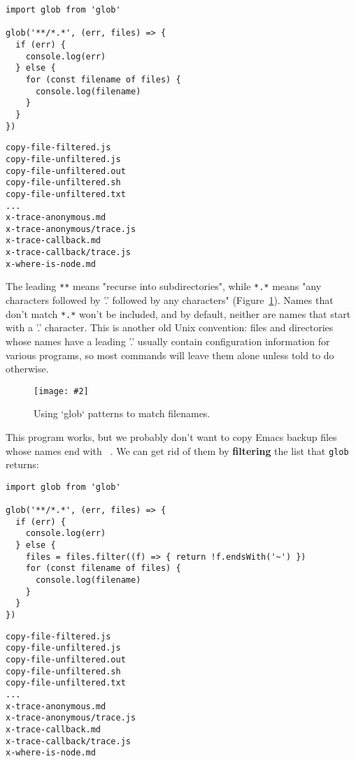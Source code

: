 \documentclass[krantzl]{krantz}
\newcommand{\figpdf}[4]{\begin{figure}%
\centering%
\texttt{[image: \#2]}%
\caption{#3}%
\label{#1}%
\end{figure}}
\newcommand{\figref}[1]{Figure~\ref{#1}}
\newcommand{\glossref}[1]{\textbf{#1}}
\begin{document}
\begin{lstlisting}[frame=single,frameround=tttt]
import glob from 'glob'

glob('**/*.*', (err, files) => {
  if (err) {
    console.log(err)
  } else {
    for (const filename of files) {
      console.log(filename)
    }
  }
})
\end{lstlisting}



\begin{lstlisting}[frame=single,frameround=tttt]
copy-file-filtered.js
copy-file-unfiltered.js
copy-file-unfiltered.out
copy-file-unfiltered.sh
copy-file-unfiltered.txt
...
x-trace-anonymous.md
x-trace-anonymous/trace.js
x-trace-callback.md
x-trace-callback/trace.js
x-where-is-node.md
\end{lstlisting}



The leading \texttt{**} means "recurse into subdirectories",
while \texttt{*.*} means "any characters followed by '.' followed by any characters"
(\figref{systems-programming-globbing}).
Names that don't match \texttt{*.*} won't be included,
and by default,
neither are names that start with a '.' character.
This is another old Unix convention:
files and directories whose names have a leading '.'
usually contain configuration information for various programs,
so most commands will leave them alone unless told to do otherwise.

\figpdf{systems-programming-globbing}{./systems-programming/globbing.pdf}{Using `glob` patterns to match filenames.}{0.6}


This program works,
but we probably don't want to copy Emacs backup files whose names end with \texttt{~}.
We can get rid of them by \glossref{filtering} the list that \texttt{glob} returns:


\begin{lstlisting}[frame=single,frameround=tttt]
import glob from 'glob'

glob('**/*.*', (err, files) => {
  if (err) {
    console.log(err)
  } else {
    files = files.filter((f) => { return !f.endsWith('~') })
    for (const filename of files) {
      console.log(filename)
    }
  }
})
\end{lstlisting}



\begin{lstlisting}[frame=single,frameround=tttt]
copy-file-filtered.js
copy-file-unfiltered.js
copy-file-unfiltered.out
copy-file-unfiltered.sh
copy-file-unfiltered.txt
...
x-trace-anonymous.md
x-trace-anonymous/trace.js
x-trace-callback.md
x-trace-callback/trace.js
x-where-is-node.md
\end{lstlisting}
\end{document}
